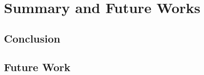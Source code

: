 \chapter{Summary and Future Works}

\section{Conclusion}
\subsection{}
  
\subsection{}

\section{Future Work}
\subsection{}
  
\subsection{}